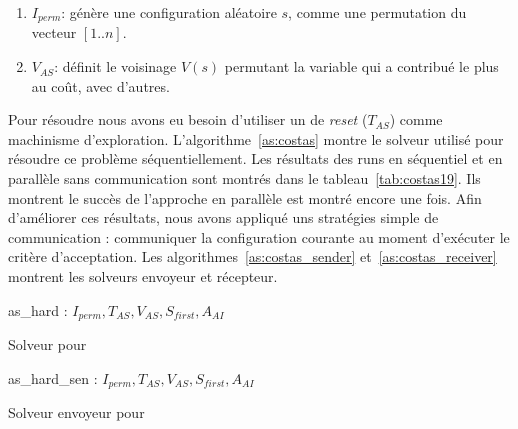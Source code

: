 \begin{enumerate}
	\item $I_{perm}$: génère une configuration aléatoire $s$, comme une permutation du vecteur $[1..n]$. 
	\item $V_{AS}$: définit le voisinage $V \left(s\right)$ permutant la variable qui a contribué le plus au coût, avec d'autres.
\end{enumerate}

Pour résoudre \CARRP{} nous avons eu besoin d'utiliser un \om{} de \textit{reset} ($T_{AS}$) comme machinisme d'exploration. L'algorithme~\ref{as:costas} montre le solveur utilisé pour résoudre ce problème séquentiellement. Les résultats des runs en séquentiel et en parallèle sans communication sont montrés dans le tableau~\ref{tab:costas19}. Ils montrent le succès de l'approche en parallèle est montré encore une fois. Afin d'améliorer ces résultats, nous avons appliqué uns stratégies   simple de communication : communiquer la configuration courante au moment d'exécuter le critère d'acceptation. Les algorithmes~\ref{as:costas_sender} et~\ref{as:costas_receiver} montrent les solveurs envoyeur et récepteur.

\begin{algorithm}[!h]
\dontprintsemicolon
\SetNoline
{}
   as\_hard\;
\algoindent{} : $I_{perm}, T_{AS}, V_{AS}, S_{first}, A_{AI}$ \;
\caption{Solveur pour \CARRP}\label{as:costas}
\end{algorithm}

\begin{algorithm}[!h]
\dontprintsemicolon
\SetNoline
{}
   as\_hard\_sen\;
\algoindent{} : $I_{perm}, T_{AS}, V_{AS}, S_{first}, A_{AI}$ \;
\caption{Solveur envoyeur pour \CARRP}\label{as:costas_sender}
\end{algorithm}

